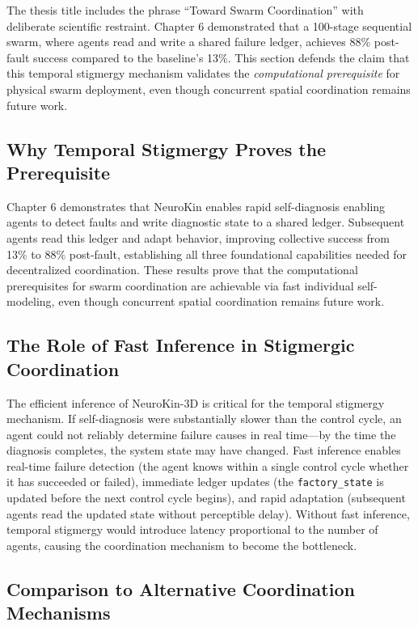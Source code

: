 \documentclass[12pt,a4paper,oneside]{report}
\begin{document}
The thesis title includes the phrase ``Toward Swarm Coordination'' with deliberate scientific restraint. Chapter 6 demonstrated that a 100-stage sequential swarm, where agents read and write a shared failure ledger, achieves 88\% post-fault success compared to the baseline's 13\%. This section defends the claim that this temporal stigmergy mechanism validates the \textit{computational prerequisite} for physical swarm deployment, even though concurrent spatial coordination remains future work.

\subsection{Why Temporal Stigmergy Proves the Prerequisite}

Chapter 6 demonstrates that NeuroKin enables rapid self-diagnosis enabling agents to detect faults and write diagnostic state to a shared ledger. Subsequent agents read this ledger and adapt behavior, improving collective success from 13\% to 88\% post-fault, establishing all three foundational capabilities needed for decentralized coordination. These results prove that the computational prerequisites for swarm coordination are achievable via fast individual self-modeling, even though concurrent spatial coordination remains future work.

\subsection{The Role of Fast Inference in Stigmergic Coordination}

The efficient inference of NeuroKin-3D is critical for the temporal stigmergy mechanism. If self-diagnosis were substantially slower than the control cycle, an agent could not reliably determine failure causes in real time---by the time the diagnosis completes, the system state may have changed. Fast inference enables real-time failure detection (the agent knows within a single control cycle whether it has succeeded or failed), immediate ledger updates (the \texttt{factory\_state} is updated before the next control cycle begins), and rapid adaptation (subsequent agents read the updated state without perceptible delay). Without fast inference, temporal stigmergy would introduce latency proportional to the number of agents, causing the coordination mechanism to become the bottleneck.

\subsection{Comparison to Alternative Coordination Mechanisms}
\end{document}
